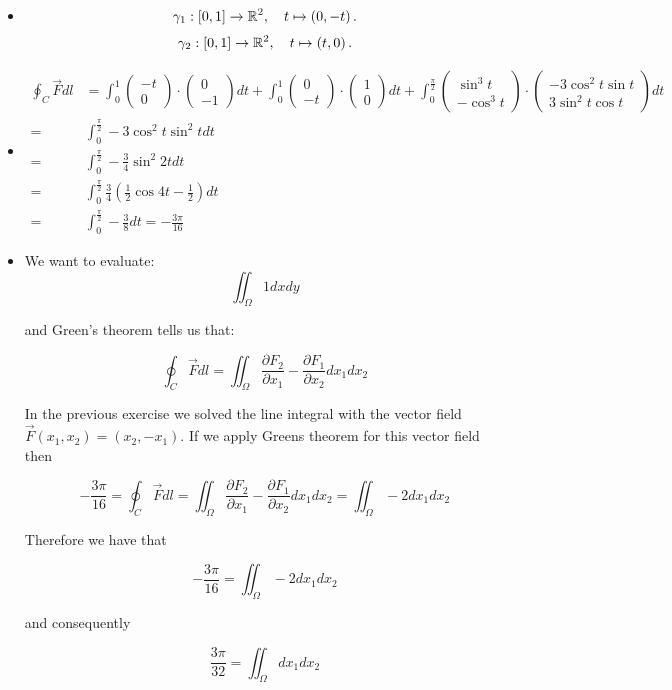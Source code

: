 \documentclass[11pt]{article}
\begin{document}
\begin{solution}     
\begin{itemize}
\item\begin{align*}
        \gamma_1 : \left[0,1\right] \to \mathbb{R}^2, \quad t \mapsto \left( 0, -t \right).
    \end{align*}
\begin{align*}
        \gamma_2 : \left[0,1\right] \to \mathbb{R}^2, \quad t \mapsto \left( t, 0 \right).
    \end{align*}
\item \begin{align*}
\oint_C \vec F dl &= \int_0^1 \begin{pmatrix} -t\\ 0\end{pmatrix}\cdot \begin{pmatrix} 0\\ -1\end{pmatrix}dt +  \int_0^1 \begin{pmatrix} 0\\ -t\end{pmatrix}\cdot \begin{pmatrix} 1\\ 0\end{pmatrix}dt +  \int_0^{\frac{\pi}{2}} \begin{pmatrix} \sin^3t\\ -\cos^3 t\end{pmatrix}\cdot \begin{pmatrix} -3\cos^2 t \sin t\\ 3\sin^2 t \cos t\end{pmatrix}dt\\
=&\int_0^{\frac{\pi}{2}} -3\cos^2 t\sin^2 tdt\\
=&\int_0^{\frac{\pi}{2}} -\frac{3}{4}\sin^2 2t dt\\
=&\int_0^{\frac{\pi}{2}} \frac{3}{4}\left(\frac{1}{2} \cos 4t - \frac{1}{2}\right)dt\\
=&\int_0^{\frac{\pi}{2}} -\frac{3}{8}dt = -\frac{3\pi}{16}
\end{align*}
\item We want to evaluate:
$$
\iint_{\Omega} 1 dxdy
$$

and Green's theorem tells us that:

$$
\oint_C \vec F dl  = \iint_{\Omega} \frac{\partial F_2}{\partial x_1} - \frac{\partial F_1}{\partial x_2} dx_1dx_2
$$

In the previous exercise we solved the line integral with the vector field $\vec F(x_1,x_2) = (x_2,-x_1)$. If we apply Greens theorem for this vector field then

$$
-\frac{3\pi}{16} = \oint_C \vec F dl  =  \iint_{\Omega} \frac{\partial F_2}{\partial x_1} - \frac{\partial F_1}{\partial x_2} dx_1dx_2 = \iint_{\Omega} -2 dx_1dx_2
$$

Therefore we have that

$$
-\frac{3\pi}{16} =  \iint_{\Omega} -2 dx_1dx_2
$$

and consequently 

$$
\frac{3\pi}{32} =  \iint_{\Omega} dx_1dx_2
$$
\end{itemize}
\end{solution}
\end{document}
